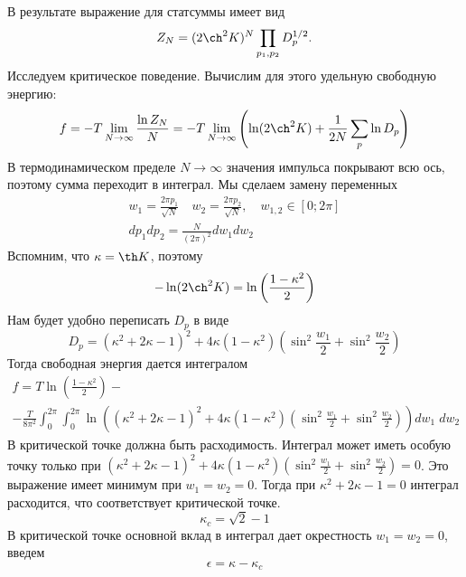 \documentclass[a4paper,12pt]{article}
\theoremstyle{definition}
\theoremstyle{definition}
\theoremstyle{definition}
\begin{document}
В результате выражение для статсуммы имеет вид
\begin{equation}
  \label{eq:133}
  Z_N=(2\ch^2 K)^N \prod_{p_1,p_2}D_p^{1/2}.
\end{equation}
Исследуем критическое поведение. Вычислим для этого удельную свободную энергию:
\begin{equation}
  \label{eq:134}
  f=-T \lim_{N\to \infty}\frac{\ln Z_N}{N}=-T \lim_{N\to \infty} \left(\ln (2\ch^2 K)+\frac{1}{2N}\sum_p \ln D_p\right)
\end{equation}
В термодинамическом пределе $N\to \infty$ значения импульса покрывают всю ось, поэтому сумма переходит в интеграл. Мы сделаем замену переменных
\begin{eqnarray}
  \label{eq:135}
  w_1=\frac{2\pi p_1}{\sqrt N}\quad  w_2=\frac{2\pi p_2}{\sqrt N},\quad w_{1,2}\in [0;2\pi]\\
  dp_1 dp_2=\frac{N}{(2\pi)^2} dw_1 dw_2
\end{eqnarray}
Вспомним, что $\kappa=\th K$, поэтому
\begin{equation}
  \label{eq:136}
  -\ln(2\ch^2 K)=\ln\left(\frac{1-\kappa^2}{2}\right)
\end{equation}
Нам будет удобно переписать $D_p$  в виде
\begin{equation}
  \label{eq:137}
  D_p=(\kappa^2+2\kappa -1)^2 +4\kappa (1-\kappa^2) \left(\sin^2 \frac{w_1}{2} +\sin^2 \frac{w_2}{2}\right)
\end{equation}
Тогда свободная энергия дается интегралом
\begin{multline}
  \label{eq:138}
  f=T\ln\left(\frac{1-\kappa^2}{2}\right)-\\
  -\frac{T}{8\pi^2}\int_0^{2\pi}\int_0^{2\pi}\ln\left((\kappa^2 +2\kappa-1)^2 +4\kappa (1-\kappa^2)\left(\sin^2 \frac{w_1}{2}+\sin^2\frac{w_2}{2}\right)\right) dw_1 \;dw_2
\end{multline}
В критической точке должна быть расходимость. Интеграл может иметь особую точку только при $(\kappa^2 +2\kappa-1)^2 +4\kappa (1-\kappa^2)\left(\sin^2 \frac{w_1}{2}+\sin^2\frac{w_2}{2}\right)=0$. Это выражение имеет минимум при $w_1=w_2=0$. Тогда при $\kappa^2+2\kappa-1=0$ интеграл расходится, что соответствует критической точке.
\begin{equation}
  \label{eq:139}
  \kappa_c=\sqrt 2 -1
\end{equation}
В критической точке основной вклад в интеграл дает окрестность $w_1=w_2=0$, введем
\begin{equation}
  \label{eq:140}
  \epsilon=\kappa-\kappa_c
\end{equation}
\end{document}
